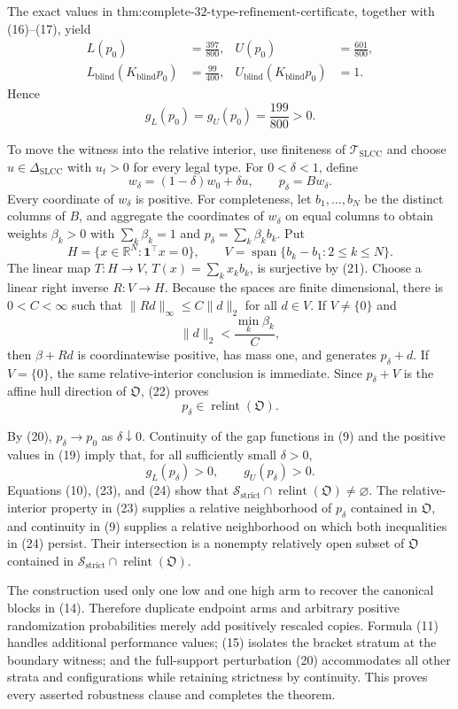 The exact values in \(\text{thm:complete-32-type-refinement-certificate}\), together with (16)--(17), yield
\[
 \begin{aligned}
 L(p_0)&=\frac{397}{800},&
 U(p_0)&=\frac{601}{800},\\
 L_{\mathrm{blind}}(K_{\mathrm{blind}}p_0)&=\frac{99}{400},&
 U_{\mathrm{blind}}(K_{\mathrm{blind}}p_0)&=1.
 \end{aligned}
\tag{18}
\]
Hence
\[
 g_L(p_0)=g_U(p_0)=\frac{199}{800}>0.
\tag{19}
\]

To move the witness into the relative interior, use finiteness of \(\mathcal T_{\mathrm{SLCC}}\) and choose \(u\in\Delta_{\mathrm{SLCC}}\) with \(u_t>0\) for every legal type.  For \(0<\delta<1\), define
\[
 w_\delta=(1-\delta)w_0+\delta u,
 \qquad p_\delta=Bw_\delta.
\tag{20}
\]
Every coordinate of \(w_\delta\) is positive.  For completeness, let \(b_1,\ldots,b_N\) be the distinct columns of \(B\), and aggregate the coordinates of \(w_\delta\) on equal columns to obtain weights \(\beta_k>0\) with \(\sum_k\beta_k=1\) and \(p_\delta=\sum_k\beta_kb_k\).  Put
\[
 H=\{x\in\mathbb R^N:\mathbf 1^{\top}x=0\},
 \qquad
 V=\operatorname{span}\{b_k-b_1:2\leq k\leq N\}.
\tag{21}
\]
The linear map \(T:H\to V\), \(T(x)=\sum_kx_kb_k\), is surjective by (21).  Choose a linear right inverse \(R:V\to H\).  Because the spaces are finite dimensional, there is \(0<C<\infty\) such that \(\|Rd\|_\infty\leq C\|d\|_2\) for all \(d\in V\).  If \(V\neq\{0\}\) and
\[
 \|d\|_2<\frac{\min_k\beta_k}{C},
\tag{22}
\]
then \(\beta+Rd\) is coordinatewise positive, has mass one, and generates \(p_\delta+d\).  If \(V=\{0\}\), the same relative-interior conclusion is immediate.  Since \(p_\delta+V\) is the affine hull direction of \(\mathfrak O\), (22) proves
\[
 p_\delta\in\operatorname{relint}(\mathfrak O).
\tag{23}
\]

By (20), \(p_\delta\to p_0\) as \(\delta\downarrow0\).  Continuity of the gap functions in (9) and the positive values in (19) imply that, for all sufficiently small \(\delta>0\),
\[
 g_L(p_\delta)>0,
 \qquad
 g_U(p_\delta)>0.
\tag{24}
\]
Equations (10), (23), and (24) show that
\(\mathcal S_{\mathrm{strict}}\cap\operatorname{relint}(\mathfrak O)\neq\varnothing\).  The relative-interior property in (23) supplies a relative neighborhood of \(p_\delta\) contained in \(\mathfrak O\), and continuity in (9) supplies a relative neighborhood on which both inequalities in (24) persist.  Their intersection is a nonempty relatively open subset of \(\mathfrak O\) contained in \(\mathcal S_{\mathrm{strict}}\cap\operatorname{relint}(\mathfrak O)\).

The construction used only one low and one high arm to recover the canonical blocks in (14).  Therefore duplicate endpoint arms and arbitrary positive randomization probabilities merely add positively rescaled copies.  Formula (11) handles additional performance values; (15) isolates the bracket stratum at the boundary witness; and the full-support perturbation (20) accommodates all other strata and configurations while retaining strictness by continuity.  This proves every asserted robustness clause and completes the theorem.